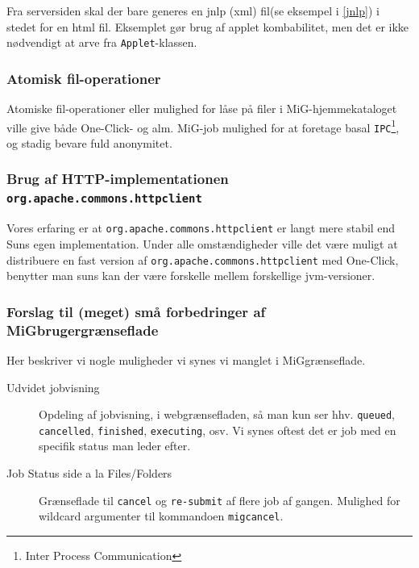 \documentclass[draft,a4paper,11pt]{article}
\newcommand{\mig}{MiG}
\newcommand{\oc}{One-Click}
\begin{document}
Fra serversiden skal der bare generes en jnlp (xml) fil(se eksempel i \ref{jnlp}) i stedet for en html fil. Eksemplet gør brug af applet kombabilitet, men det er ikke nødvendigt at arve fra \texttt{Applet}-klassen.

\subsubsection*{Atomisk fil-operationer}
Atomiske fil-operationer eller mulighed for låse på filer i \mig-hjemmekataloget ville give både \oc- og alm. \mig-job mulighed for at foretage basal \texttt{IPC}\footnote{Inter Process Communication}, og stadig bevare fuld anonymitet. 

\subsubsection*{Brug af HTTP-implementationen \texttt{org.apache.commons.httpclient}}
Vores erfaring er at \texttt{org.apache.commons.httpclient} er langt mere stabil end Suns egen implementation. Under alle omstændigheder ville det være muligt at distribuere en fast version af \texttt{org.apache.commons.httpclient} med \oc, benytter man suns kan der være forskelle mellem forskellige jvm-versioner.

\subsubsection*{Forslag til (meget) små forbedringer af \mig brugergrænseflade}

Her beskriver vi nogle muligheder vi synes vi manglet i \mig grænseflade.
\begin{description}
	\item[Udvidet jobvisning]
	Opdeling af jobvisning, i webgrænsefladen, så man kun ser hhv. \texttt{queued}, \texttt{cancelled}, \texttt{finished}, \texttt{executing}, osv. Vi synes oftest det er job med en specifik status man leder efter.
	\item[Job Status side a la Files/Folders] 
	Grænseflade til \texttt{cancel} og \texttt{re-submit} af flere job af gangen. Mulighed for wildcard argumenter til kommandoen \texttt{migcancel}.
\end{description}

\end{document}
